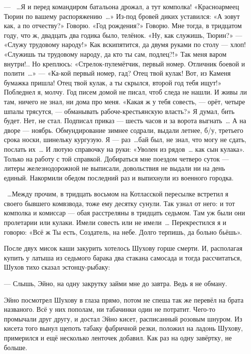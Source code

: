 --- ~\dots{}Я и перед командиром батальона дрожал, а тут комполка! «Красноармеец Тюрин по вашему 
распоряжению~\dots{}» Из-под бровей диких уставился: «А зовут как, а по отчеству?» Говорю. «Год 
рождения?» Говорю. Мне тогда, в тридцатом году, что ж, двадцать два годика было, телёнок. «Ну, 
как служишь, Тюрин?» --- «Служу трудовому народу!» Как вскипятится, да двумя руками по столу --- 
хлоп! «Служишь ты трудовому народу, да кто ты сам, подлец?!» Так меня варом внутри!.. Но 
креплюсь: «Стрелок-пулемётчик, первый номер. Отличник боевой и полити~\dots{}» --- «Ка-кой первый 
номер, гад? Отец твой кулак! Вот, из Каменя бумажка пришла! Отец твой кулак, а ты скрылся, 
второй год тебя ищут!» Побледнел я, молчу. Год писем домой не писал, чтоб следа не нашли. И 
живы ли там, ничего не знал, ни дома про меня. «Какая ж у тебя совесть, --- орёт, четыре шпалы 
трясутся, --- обманывать рабоче-крестьянскую власть?» Я думал, бить будет. Нет, не стал. 
Подписал приказ --- шесть часов и за ворота выгнать~\dots{} А на дворе --- ноябрь. Обмундирование 
зимнее содрали, выдали летнее, б/у, третьего срока носки, шинельку кургузую. Я --- раз~\dots{}бай 
был, не знал, что могу не сдать, послать их~\dots{} И лютую справочку на руки: «Уволен из 
рядов~\dots{} как сын кулака». Только на работу с той справкой. Добираться мне поездом четверо 
суток --- литеры железнодорожной не выписали, довольствия не выдали ни на день единый. 
Накормили обедом последний раз и выпихнули из военного городка.

~\dots{}Между прочим, в тридцать восьмом на Котласской пересылке встретил я своего бывшего 
комвзвода, тоже ему десятку сунули. Так узнал от него: и тот комполка и комиссар --- обая 
расстреляны в тридцать седьмом. Там уж были они пролетарии или кулаки. Имели совесть или не 
имели~\dots{} Перекрестился я и говорю: «Всё ж Ты есть, Создатель, на небе. Долго терпишь, да 
больно бьёшь».

После двух мисок каши закурить хотелось Шухову горше смерти. И, располагая купить у латыша 
из седьмого барака два стакана самосада и тогда рассчитаться, Шухов тихо сказал 
эстонцу-рыбаку:

--- Слышь, Эйно, на одну закрутку займи мне до завтра. Ведь я не обману.

Эйно посмотрел Шухову в глаза прямо, потом не спеша так же перевёл на брата названого. Всё у 
них пополам, ни табачинки один не потратит. Чего-то промычали друг другу, и достал Эйно кисет, 
расписанный розовым шнуром. Из кисета того вынул щепоть табаку фабричной резки, положил на 
ладонь Шухову, примерился и ещё несколько ленточек добавил. Как раз на одну завёртку, не 
больше.

